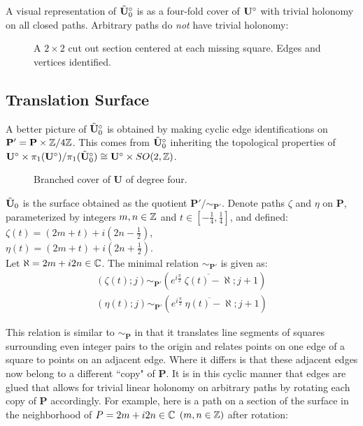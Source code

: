 \documentclass[]{article}
\def\btUos{\btU_0^\circ}
\begin{document}
A visual representation of $\btUos$ is as a four-fold cover of $\mathbf{U}^\circ$ with trivial holonomy on all closed paths. Arbitrary paths do \emph{not} have trivial holonomy:



\begin{figure}[H]
\centering

\caption{A $2\times2$ cut out section centered at each missing square. Edges and vertices identified.}
\label{fig:quotient}
\end{figure}

\subsection{Translation Surface}

A better picture of $\btUos$ is obtained by making cyclic edge identifications on $\mathbf{P'}=\mathbf{P}\times\mathbb{Z}/4\mathbb{Z}$. This comes from $\btUos$ inheriting the topological properties of $\bUs\times \pi_1(\bUs)/\pi_1(\btUos)\cong \bUs\times SO(2,\ZZ)$.


\begin{figure}[H]
\centering

\label{fig:utilda0}
\caption{Branched cover of $\mathbf{U}$ of degree four.}
\end{figure}

\begin{Def}
$\tilde{\mathbf{U}}_0$ is the surface obtained as the quotient $\mathbf{P}'/\sim_{\mathbf{P}'}$. Denote paths $\zeta$ and $\eta$  on $\mathbf{P}$, parameterized by integers $m,n\in\mathbb{Z}$ and $t\in[-\frac{1}{4},\frac{1}{4}]$, and defined:\\ $\zeta(t)=(2m+t)+i(2n-\frac{1}{2})$,\\
$\eta(t)=(2m+t)+i(2n+\frac{1}{2})$.\\

Let $\aleph=2m+i2n\in\mathbb{C}$. The minimal relation $\sim_{\mathbf{P}'}$ is given as:
\begin{equation}
\begin{split}
(\zeta(t);j)\sim_{\mathbf{P'}}(e^{i\frac{\pi}{2}}~\overline{\zeta(t)-\aleph};j+1)\\
(\eta(t);j)\sim_{\mathbf{P'}}(e^{i\frac{\pi}{2}}~\overline{\eta(t)-\aleph};j+1)
\end{split}
\end{equation}
\end{Def}
This relation is similar to $\sim_\mathbf{P}$ in that it translates line segments of squares surrounding even integer pairs to the origin and relates points on one edge of a square to points on an adjacent edge. Where it differs is that these adjacent edges now belong to a different ``copy" of $\mathbf{P}$. It is in this cyclic manner that edges are glued that allows for trivial linear holonomy on arbitrary paths by rotating each copy of $\mathbf{P}$ accordingly. For example, here is a path on a section of the surface in the neighborhood of $P=2m+i2n\in\mathbb{C}$ $(m,n\in\mathbb{Z})$ after rotation:
\end{document}
